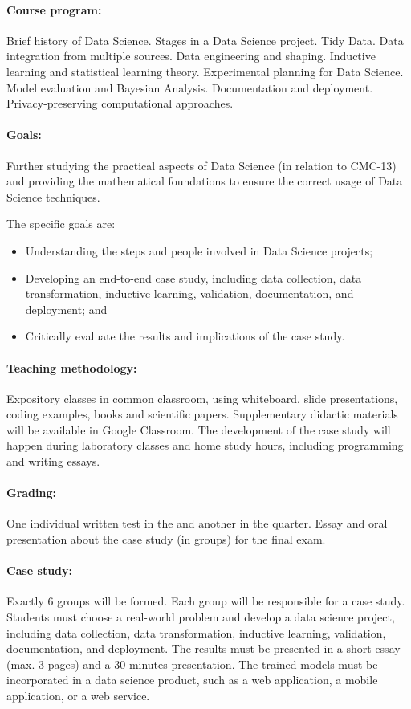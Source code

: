 \paragraph{Course program:}
Brief history of Data Science. Stages in a Data Science project. Tidy Data. Data
integration from multiple sources. Data engineering and shaping. Inductive learning and
statistical learning theory. Experimental planning for Data Science. Model evaluation and
Bayesian Analysis. Documentation and deployment. Privacy-preserving computational
approaches.

\paragraph{Goals:}
Further studying the practical aspects of Data Science (in relation to CMC-13) and providing
the mathematical foundations to ensure the correct usage of Data Science techniques.

The specific goals are:
\begin{itemize}
  \item Understanding the steps and people involved in Data Science projects;
  \item Developing an end-to-end case study, including data collection, data transformation,
    inductive learning, validation, documentation, and deployment; and
  \item Critically evaluate the results and implications of the case study.
\end{itemize}

\paragraph{Teaching methodology:}
Expository classes in common classroom, using whiteboard, slide presentations, coding
examples, books and scientific papers. Supplementary didactic materials will be available
in Google Classroom. The development of the case study will happen during laboratory
classes and home study hours, including programming and writing essays.

\paragraph{Grading:} One individual written test in the  and another in the  quarter.
Essay and oral presentation about the case study (in groups) for the final exam.

\paragraph{Case study:} Exactly 6 groups will be formed.  Each group will be responsible for
a case study.  Students must choose a real-world problem and develop a data science
project, including data collection, data transformation, inductive learning, validation,
documentation, and deployment.  The results must be presented in a short essay (max. 3
pages) and a 30 minutes presentation.  The trained models must be incorporated in a data
science product, such as a web application, a mobile application, or a web service.

